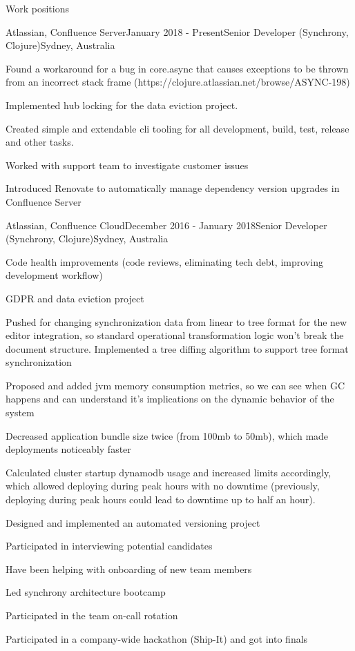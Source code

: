 \documentclass{resume} %
\begin{document}
\begin{rSection}{Work positions}
\begin{rSubsection}{Atlassian, Confluence Server}{January 2018 - Present}{Senior Developer (Synchrony, Clojure)}{Sydney, Australia}
\item Found a workaround for a bug in core.async that causes exceptions to be thrown from an incorrect stack frame (https://clojure.atlassian.net/browse/ASYNC-198)
\item Implemented hub locking for the data eviction project.
\item Created simple and extendable cli tooling for all development, build, test, release and other tasks.
\item Worked with support team to investigate customer issues
\item Introduced Renovate to automatically manage dependency version upgrades in Confluence Server
~
\end{rSubsection}

\begin{rSubsection}{Atlassian, Confluence Cloud}{December 2016 - January 2018}{Senior Developer (Synchrony, Clojure)}{Sydney, Australia}

\item Code health improvements (code reviews, eliminating tech debt, improving development workflow)
\item GDPR and data eviction project
\item Pushed for changing synchronization data from linear to tree format for the new editor integration, so standard operational transformation logic won't break the document structure. Implemented a tree diffing algorithm to support tree format synchronization
\item Proposed and added jvm memory consumption metrics, so we can see when GC happens and can understand it's implications on the dynamic behavior of the system
\item Decreased application bundle size twice (from 100mb to 50mb), which made deployments noticeably faster
\item Calculated cluster startup dynamodb usage and increased limits accordingly, which allowed deploying during peak hours with no downtime (previously, deploying during peak hours could lead to downtime up to half an hour).
\item Designed and implemented an automated versioning project
\item Participated in interviewing potential candidates
\item Have been helping with onboarding of new team members
\item Led synchrony architecture bootcamp
\item Participated in the team on-call rotation
\item Participated in a company-wide hackathon (Ship-It) and got into finals
~
\end{rSubsection}


\end{rSection}
\end{document}
